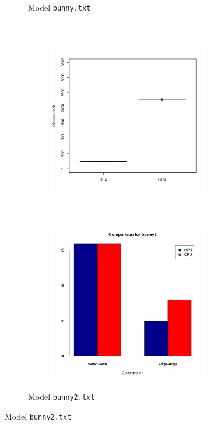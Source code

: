 \begin{figure}
\begin{subfigure}[b]{0.45\textwidth}
\begin{subfigure}[b]{0.45\textwidth}
			\end{subfigure}
			\caption{Model \texttt{bunny.txt}}
		\end{subfigure}
		~%
		\begin{subfigure}[b]{0.45\textwidth}
			\begin{subfigure}[b]{0.45\textwidth}
				\includegraphics[width=\textwidth]{results/time/bunny2}
			\end{subfigure}
			~%
			\begin{subfigure}[b]{0.45\textwidth}
				\includegraphics[width=\textwidth]{results/correctness/bunny2}
			\end{subfigure}
			\caption{Model \texttt{bunny2.txt}}
		\end{subfigure}
		

\end{figure}
